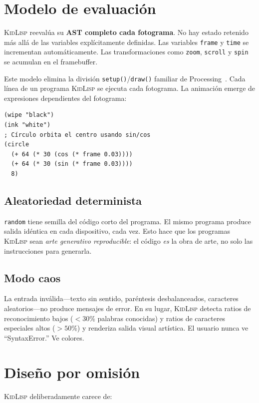 \documentclass[10pt,letterpaper,twocolumn]{article}
\newcommand{\kl}{\textsc{KidLisp}}
\begin{document}
\section{Modelo de evaluación}

\kl{} reevalúa su \textbf{AST completo cada fotograma}. No hay estado retenido más allá de las variables explícitamente definidas. Las variables \texttt{frame} y \texttt{time} se incrementan automáticamente. Las transformaciones como \texttt{zoom}, \texttt{scroll} y \texttt{spin} se acumulan en el framebuffer.

Este modelo elimina la división \texttt{setup()}/\texttt{draw()} familiar de Processing~\citep{reas2007processing}. Cada línea de un programa \kl{} se ejecuta cada fotograma. La animación emerge de expresiones dependientes del fotograma:

\begin{lstlisting}
(wipe "black")
(ink "white")
; Círculo orbita el centro usando sin/cos
(circle
  (+ 64 (* 30 (cos (* frame 0.03))))
  (+ 64 (* 30 (sin (* frame 0.03))))
  8)
\end{lstlisting}

\subsection{Aleatoriedad determinista}

\texttt{random} tiene semilla del código corto del programa. El mismo programa produce salida idéntica en cada dispositivo, cada vez. Esto hace que los programas \kl{} sean \emph{arte generativo reproducible}: el código \emph{es} la obra de arte, no solo las instrucciones para generarla.

\subsection{Modo caos}

La entrada inválida---texto sin sentido, paréntesis desbalanceados, caracteres aleatorios---no produce mensajes de error. En su lugar, \kl{} detecta ratios de reconocimiento bajos ($<30\%$ palabras conocidas) y ratios de caracteres especiales altos ($>50\%$) y renderiza salida visual artística. El usuario nunca ve ``SyntaxError.'' Ve colores.

\section{Diseño por omisión}

\kl{} deliberadamente carece de:
\end{document}
